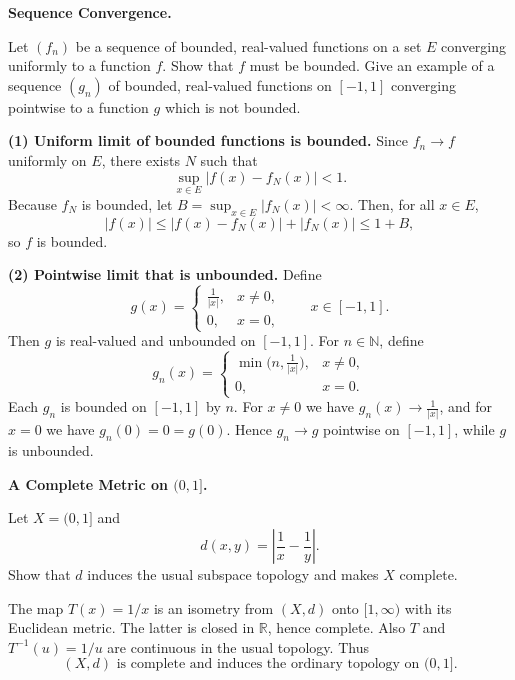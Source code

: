 \begin{problem}[CP-II-0355]
\label{prob:cp-ii-0355}
\textbf{Sequence Convergence.}

\hspace*{1.5em}Let $(f_n)$ be a sequence of bounded, real-valued functions on a set $E$ converging uniformly to a function $f$.
Show that $f$ must be bounded. Give an example of a sequence $(g_n)$ of bounded, real-valued
functions on $[-1,1]$ converging pointwise to a function $g$ which is not bounded.
\end{problem}

\begin{solution}
\par\medskip\noindent\textbf{(1) Uniform limit of bounded functions is bounded.}\quad
Since $f_n\to f$ uniformly on $E$, there exists $N$ such that
\[
\sup_{x\in E}|f(x)-f_N(x)|<1.
\]
Because $f_N$ is bounded, let $B=\sup_{x\in E}|f_N(x)|<\infty$. Then, for all $x\in E$,
\[
|f(x)|\le |f(x)-f_N(x)|+|f_N(x)|\le 1+B,
\]
so $f$ is bounded.

\par\medskip\noindent\textbf{(2) Pointwise limit that is unbounded.}\quad
Define
\[
g(x)=
\begin{cases}
	\frac{1}{|x|}, & x\neq 0,\\
	0, & x=0,
\end{cases}
\qquad x\in[-1,1].
\]
Then $g$ is real-valued and unbounded on $[-1,1]$.
For $n\in\mathbb{N}$, define
\[
g_n(x)=
\begin{cases}
	\min\!\big(n,\tfrac{1}{|x|}\big), & x\neq 0,\\
	0, & x=0.
\end{cases}
\]
Each $g_n$ is bounded on $[-1,1]$ by $n$. For $x\neq 0$ we have $g_n(x)\to \frac{1}{|x|}$, and for $x=0$ we have $g_n(0)=0=g(0)$. Hence $g_n\to g$ pointwise on $[-1,1]$, while $g$ is unbounded.
\end{solution}

\begin{problem}[CP-II-0356]
\label{prob:cp-ii-0356}
\textbf{A Complete Metric on \((0,1]\).}

\hspace*{1.5em}Let \(X=(0,1]\) and
\[
d(x,y)=\left|\frac1x-\frac1y\right|.
\]
Show that \(d\) induces the usual subspace topology and makes \(X\) complete.
\end{problem}

\begin{solution}
The map \(T(x)=1/x\) is an isometry from \((X,d)\) onto \([1,\infty)\) with its Euclidean metric. The latter is closed in \(\mathbb R\), hence complete. Also \(T\) and \(T^{-1}(u)=1/u\) are continuous in the usual topology. Thus
\[
\boxed{(X,d)\text{ is complete and induces the ordinary topology on }(0,1].}
\]
\end{solution}


